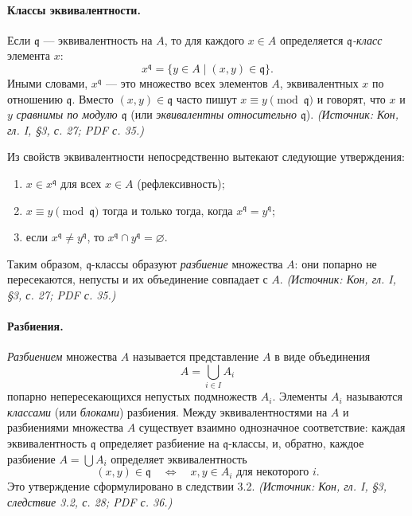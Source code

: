 \documentclass[a4paper,12pt]{article}
\begin{document}
\paragraph{Классы эквивалентности.}
Если \(\mathfrak{q}\) — эквивалентность на \(A\), то для каждого \(x\in A\) определяется \emph{\(\mathfrak{q}\)-класс} элемента \(x\):
\[
x^{\mathfrak{q}}=\{y\in A\mid (x,y)\in\mathfrak{q}\}.
\]
Иными словами, \(x^{\mathfrak{q}}\) — это множество всех элементов \(A\), эквивалентных \(x\) по отношению \(\mathfrak{q}\). Вместо \((x,y)\in\mathfrak{q}\) часто пишут \(x\equiv y\pmod{\mathfrak{q}}\) и говорят, что \(x\) и \(y\) \emph{сравнимы по модулю \(\mathfrak{q}\)} (или \emph{эквивалентны относительно \(\mathfrak{q}\)}).
\textit{(Источник: Кон, гл. I, §3, с. 27; PDF с. 35.)}

Из свойств эквивалентности непосредственно вытекают следующие утверждения:
\begin{enumerate}[label=(\arabic*)]
\item \(x\in x^{\mathfrak{q}}\) для всех \(x\in A\) (рефлексивность);
\item \(x\equiv y\pmod{\mathfrak{q}}\) тогда и только тогда, когда \(x^{\mathfrak{q}}=y^{\mathfrak{q}}\);
\item если \(x^{\mathfrak{q}}\neq y^{\mathfrak{q}}\), то \(x^{\mathfrak{q}}\cap y^{\mathfrak{q}}=\varnothing\).
\end{enumerate}
Таким образом, \(\mathfrak{q}\)-классы образуют \emph{разбиение} множества \(A\): они попарно не пересекаются, непусты и их объединение совпадает с \(A\).
\textit{(Источник: Кон, гл. I, §3, с. 27; PDF с. 35.)}

\paragraph{Разбиения.}
\emph{Разбиением} множества \(A\) называется представление \(A\) в виде объединения
\[
A=\bigcup_{i\in I}A_i
\]
попарно непересекающихся непустых подмножеств \(A_i\). Элементы \(A_i\) называются \emph{классами} (или \emph{блоками}) разбиения. Между эквивалентностями на \(A\) и разбиениями множества \(A\) существует взаимно однозначное соответствие: каждая эквивалентность \(\mathfrak{q}\) определяет разбиение на \(\mathfrak{q}\)-классы, и, обратно, каждое разбиение \(A=\bigcup A_i\) определяет эквивалентность
\[
(x,y)\in\mathfrak{q}\quad\Longleftrightarrow\quad x,y\in A_i\text{ для некоторого }i.
\]
Это утверждение сформулировано в следствии 3.2.
\textit{(Источник: Кон, гл. I, §3, следствие 3.2, с. 28; PDF с. 36.)}
\end{document}

